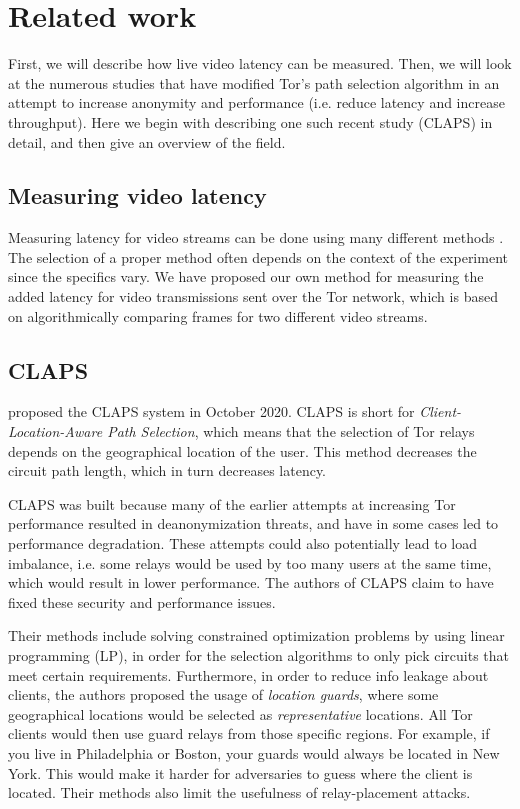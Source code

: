 \documentclass{kththesis}
\begin{document}
\section{Related work}
\label{section:relatedWork}
First, we will describe how live video latency can be measured. Then, we will look at the numerous studies that have modified Tor's path selection algorithm in an attempt to increase anonymity and performance (i.e. reduce latency and increase throughput). Here we begin with describing one such recent study (CLAPS) in detail, and then give an overview of the field.

\subsection{Measuring video latency}
Measuring latency for video streams can be done using many different methods \parencite{hill2009measuring}\parencite{sielhorst2007measurement}. The selection of a proper method often depends on the context of the experiment since the specifics vary. We have proposed our own method for measuring the added latency for video transmissions sent over the Tor network, which is based on algorithmically comparing frames for two different video streams.

\subsection{CLAPS}
\label{section:CLAPS}
\textcite{CLAPS} proposed the CLAPS system in October 2020. CLAPS is short for \emph{Client-Location-Aware Path Selection}, which means that the selection of Tor relays depends on the geographical location of the user. This method decreases the circuit path length, which in turn decreases latency.

CLAPS was built because many of the earlier attempts at increasing Tor performance resulted in deanonymization threats, and have in some cases led to performance degradation. These attempts could also potentially lead to load imbalance, i.e. some relays would be used by too many users at the same time, which would result in lower performance. The authors of CLAPS claim to have fixed these security and performance issues.

Their methods include solving constrained optimization problems by using linear programming (LP), in order for the selection algorithms to only pick circuits that meet certain requirements. Furthermore, in order to reduce info leakage about clients, the authors proposed the usage of \emph{location guards}, where some geographical locations would be selected as \emph{representative} locations. All Tor clients would then use guard relays from those specific regions. For example, if you live in Philadelphia or Boston, your guards would always be located in New York. This would make it harder for adversaries to guess where the client is located. Their methods also limit the usefulness of relay-placement attacks. 
\end{document}
